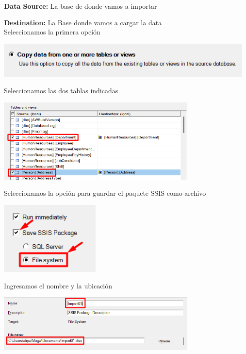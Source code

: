 \documentclass[12pt,letterpaper]{article}
\begin{document}
\textbf{Data Source:} La base de donde vamos a importar

\textbf{Destination:} La Base donde vamos a cargar la data\\

Seleccionamos la primera opción

\begin{center}
    \includegraphics[width=13cm]{./img/img4.png}
\end{center}

Seleccionamos las dos tablas indicadas

\begin{center}
    \includegraphics[width=10cm]{./img/img5.png}
\end{center}

Seleccionamos la opción para guardar el paquete SSIS como archivo

\begin{center}
    \includegraphics[width=5cm]{./img/img6.png}
\end{center}

Ingresamos el nombre y la ubicación

\begin{center}
    \includegraphics[width=10cm]{./img/img7.png}
\end{center}
\end{document}
